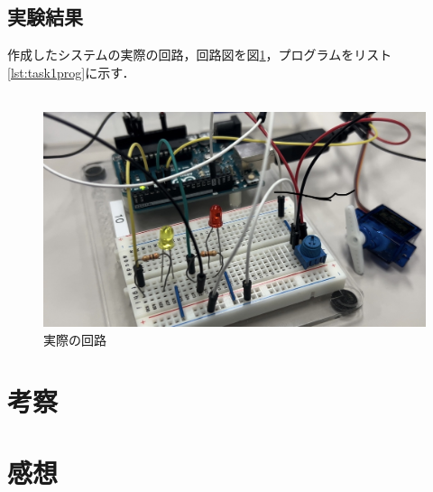 \documentclass{ltjsarticle}
\begin{document}
\subsection{実験結果}
作成したシステムの実際の回路，回路図を図\ref{fig:task1}，プログラムをリスト\ref{lst:task1prog}に示す．\\\\
\begin{figure}[h]
  \centering
  \includegraphics[width=\linewidth]{figures/task1.jpg}
  \caption{実際の回路}
  \label{fig:task1}
\end{figure}

\clearpage




\section{考察}




\section{感想}

\begin{thebibliography}{9}
\end{thebibliography}
\end{document}
